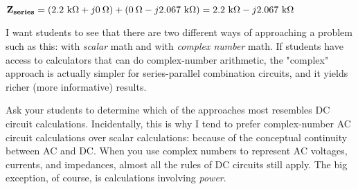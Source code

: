 ${\bf Z_{series}} = (2.2 \hbox{ k}\Omega + j0 \> \Omega) + (0 \> \Omega - j2.067 \hbox{ k}\Omega) = 2.2 \hbox{ k}\Omega - j2.067 \hbox{ k}\Omega$







I want students to see that there are two different ways of approaching a problem such as this: with {\it scalar} math and with {\it complex number} math.  If students have access to calculators that can do complex-number arithmetic, the "complex" approach is actually simpler for series-parallel combination circuits, and it yields richer (more informative) results.

Ask your students to determine which of the approaches most resembles DC circuit calculations.  Incidentally, this is why I tend to prefer complex-number AC circuit calculations over scalar calculations: because of the conceptual continuity between AC and DC.  When you use complex numbers to represent AC voltages, currents, and impedances, almost all the rules of DC circuits still apply.  The big exception, of course, is calculations involving {\it power}.




